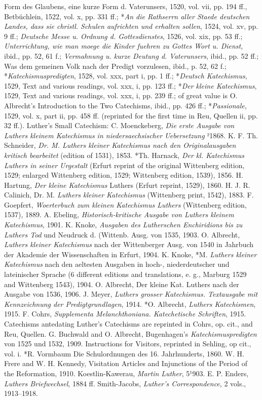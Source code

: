 Form des Glaubens, eine kurze Form d. Vaterunsers, 1520, vol. vii, pp. 194 ff., Betbüchlein, 1522, vol. x, pp. 331 ff.; *\emph{An die Rathserrn aller Staede deutschen Landes, dass sie christl. Schulen aufrichten und erhalten sollen}, 1524, vol. xv, pp. 9 ff.; \emph{Deutsche Messe u. Ordnung d. Gottesdienstes}, 1526, vol. xix, pp. 53 ff.; \emph{Unterrichtung, wie man moege die Kinder fuehren zu Gottes Wort u. Dienst}, ibid., pp. 52, 61 f.; \emph{Vermahnung u. kurze Deutung d. Vaterunsers}, ibid., pp. 52 ff.; Was dem gemeinen Volk nach der Predigt vorzulesen, ibid., p. 52, 62 f.; *\emph{Katechismuspredigten}, 1528, vol. xxx, part i, pp. 1 ff.; *\emph{Deutsch Katechismus}, 1529, Text and various readings, vol. xxx, i, pp. 123 ff.; *\emph{\emph{Der kleine Katechismus}}, 1529, Text and various readings, vol. xxx, i, pp. 239 ff.; of great value is O. Albrecht's Introduction to the Two Catechisms, ibid., pp. 426 ff.; *\emph{Passionale}, 1529, vol. x, part ii, pp. 458 ff. (reprinted for the first time in Reu, Quellen ii, pp. 32 ff.). Luther's Small Catechism: C. Moenckeberg, \emph{Die erste Ausgabe von Luthers kleinem Katechismus in niedersaechsischer Uebersetzung} ²1868. K. F. Th. Schneider, \emph{Dr. M. \emph{Luthers kleiner Katechismus} nach den Originalausgaben kritisch bearbeitet} (edition of 1531), 1853. *Th. Harnack, \emph{Der kl. Katechismus Luthers in seiner Urgestalt} (Erfurt reprint of the original Wittenberg edition, 1529; enlarged Wittenberg edition, 1529; Wittenberg edition, 1539), 1856. H. Hartung, \emph{\emph{Der kleine Katechismus}} Luthers (Erfurt reprint, 1529), 1860. H. J. R. Calinich, Dr. M. \emph{Luthers kleiner Katechismus} (Wittenberg print, 1542), 1883. F. Goepfert, \emph{Woerterbuch zum kleinen Katechismus Luthers} (Wittenberg edition, 1537), 1889. A. Ebeling, \emph{Historisch-kritische Ausgabe von Luthers kleinem Katechismus}, 1901. K. Knoke, \emph{Ausgaben des Lutherschen Enchiridions bis zu Luthers Tod} und Neudruck d. (Wittenb. Ausg. von 1535, 1903. O. Albrecht, \emph{Luthers kleiner Katechismus} nach der Wittenberger Ausg. von 1540 in Jahrbuch der Akademie der Wissenschaften in Erfurt, 1904. K. Knoke, *M. \emph{Luthers kleiner Katechismus} nach den aeltesten Ausgaben in hoch-, niederdeutscher und lateinischer Sprache (6 different editions and translations, e. g., Marburg 1529 and Wittenberg 1543), 1904. O. Albrecht, Der kleine Kat. Luthers nach der Ausgabe von 1536, 1906. J. Meyer, \emph{Luthers grosser Katechismus. Textausgabe mit Kennzeichnung der Predigtgrundlagen}, 1914. *O. Albrecht, \emph{Luthers Katechismen}, 1915. F. Cohrs, \emph{Supplementa Melanchthoniana. Katechetische Schriften}, 1915. Catechisms antedating Luther's Catechisms are reprinted in Cohrs, op. cit., and Reu, Quellen. G. Buchwald and O. Albrecht, Bugenhagen's \emph{Katechismuspredigten} von 1525 und 1532, 1909. Instructions for Visitors, reprinted in Sehling, op cit., vol. i. *R. Vormbaum
Die Schulordnungen des 16. Jahrhunderts, 1860. W. H. Frere and W. H. Kennedy, Visitation Articles and Injunctions of the Period of the Reformation, 1910. Koestlin-Kawerau, \emph{Martin Luther}, 5¹903. E. P. Enders, \emph{Luthers Briefwechsel}, 1884 ff. Smith-Jacobs, \emph{Luther’s Correspondence}, 2 vols., 1913–1918.

